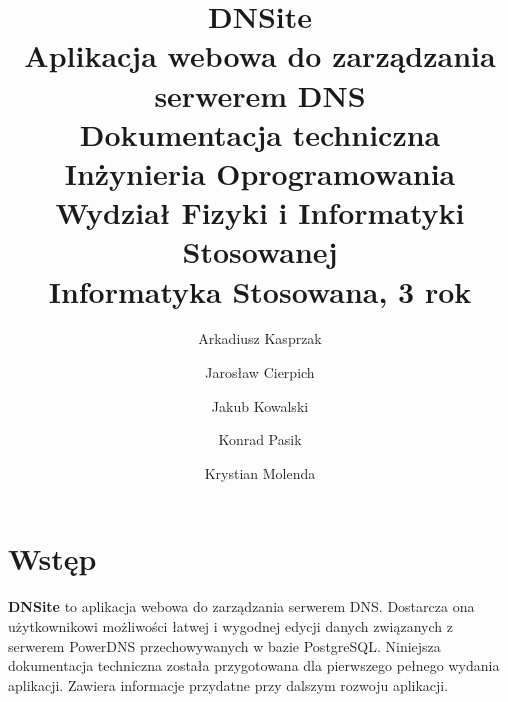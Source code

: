 \documentclass[11pt]{article}
\title 
{	
	{
		\textbf{\textsf{\Huge\color{orange}DNS\color{white}ite}} \\ [0.1in]
		\normalfont\sffamily\LARGE\color{white}
		Aplikacja webowa do zarządzania serwerem DNS \\[0.1in]
		Dokumentacja techniczna\\ [1.5in]
		\large 
		Inżynieria Oprogramowania \\
		Wydział Fizyki i Informatyki Stosowanej \\
		Informatyka Stosowana, 3 rok \\
	}
}
\author 
{
	\color{white}\normalfont\sffamily Arkadiusz Kasprzak \and 
	\color{white}\normalfont\sffamily Jarosław Cierpich \and 
	\color{white}\normalfont\sffamily Jakub Kowalski \and 
	\color{white}\normalfont\sffamily Konrad Pasik \and 
	\color{white}\normalfont\sffamily Krystian Molenda
}
\date{}
\begin{document}
\pagecolor{backgroundColor}
\maketitle
\thispagestyle{empty}


\newpage
\clearpage
{}
\pagecolor{white}

\tableofcontents

\newpage 

\section{Wstęp}
\textbf{DNSite} to aplikacja webowa do zarządzania serwerem DNS. Dostarcza ona użytkownikowi możliwości łatwej i wygodnej edycji danych związanych z serwerem PowerDNS przechowywanych w bazie PostgreSQL.\newline
Niniejsza dokumentacja techniczna została przygotowana dla pierwszego pełnego wydania aplikacji. Zawiera informacje przydatne przy dalszym rozwoju aplikacji.
\end{document}
